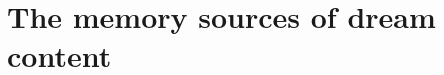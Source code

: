 \cleardoublepage

\chapter{The memory sources of dream content}
\label{res:wle}

\cleardoublepage

% 
